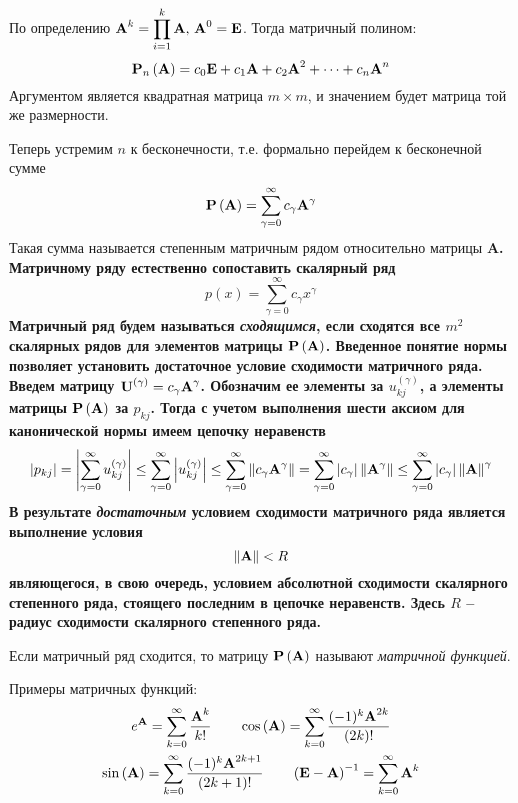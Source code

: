 По определению $\displaystyle \bf{A}^k = \prod_{i=1}^k \bf{A}, \, \bf{A}^0 = \bf{E}$. Тогда матричный полином:
\begin{equation*}
    \bf{P}_n \left( \bf{A} \right) = c_0 \bf{E} + c_1 \bf{A} + c_2 \bf{A}^2 + \dots + c_n \bf{A}^n
\end{equation*}
Аргументом является квадратная матрица $m \times m$, и значением будет матрица той же размерности.

Теперь устремим $n$ к бесконечности, т.е. формально перейдем к бесконечной сумме
\begin{equation}
    \bf{P}\left( \bf{A} \right) = \sum_{\gamma = 0}^{\infty} c_{\gamma} \bf{A}^{\gamma} \label{eq:matrix_row}
\end{equation}
Такая сумма называется степенным матричным рядом относительно матрицы \bf{A}. Матричному ряду естественно сопоставить
скалярный ряд
\begin{equation*}
    p(x) = \sum_{\gamma = 0}^{\infty} c_{\gamma} x^{\gamma}
\end{equation*}
Матричный ряд будем называться \emph{сходящимся}, если сходятся все $m^2$ скалярных рядов для элементов матрицы
$\bf{P}\left( \bf{A} \right)$. Введенное понятие нормы позволяет установить достаточное условие сходимости матричного
ряда. Введем матрицу $\displaystyle \bf{U}^{(\gamma)} = c_{\gamma}\bf{A}^{\gamma}$. Обозначим ее элементы за
$\displaystyle u_{kj}^{(\gamma)}$, а элементы матрицы $\bf{P} \left( \bf{A} \right)$ за $\displaystyle p_{kj}$. Тогда с учетом
выполнения шести аксиом для канонической нормы имеем цепочку неравенств
\begin{equation*}
    \displaystyle \left| p_{kj} \right| = \left| \sum_{\gamma = 0}^{\infty} u_{kj}^{(\gamma)} \right| \leq \sum_{\gamma = 0}^{\infty} \left| u_{kj}^{(\gamma)} \right|
    \leq \sum_{\gamma = 0}^{\infty} \left\| c_{\gamma} \bf{A}^{\gamma} \right\| = \sum_{\gamma = 0}^{\infty} \left| c_{\gamma} \right| \left\| \bf{A}^{\gamma} \right\|
    \leq \sum_{\gamma = 0}^{\infty} \left| c_{\gamma} \right| \left\| \bf{A} \right\|^{\gamma}
\end{equation*}
В результате \emph{достаточным} условием сходимости матричного ряда является выполнение условия
\begin{equation}
    \left\| \bf{A} \right\| < R
\end{equation}
являющегося, в свою очередь, условием абсолютной сходимости скалярного степенного ряда, стоящего последним в цепочке
неравенств. Здесь $R$ -- радиус сходимости скалярного степенного ряда.

\begin{definition}
    Если матричный ряд сходится, то матрицу $\bf{P} \left( \bf{A} \right)$ называют \emph{матричной функцией}.
\end{definition}
Примеры матричных функций:
\begin{gather*}
    e^{\bf{A}} = \sum_{k=0}^{\infty} \frac{\bf{A}^k}{k!} \qquad \cos\left( \bf{A} \right) = \sum_{k=0}^{\infty} \frac{(-1)^k \bf{A}^{2k}}{(2k)!} \\
    \sin \left( \bf{A} \right) = \sum_{k=0}^{\infty} \frac{(-1)^k \bf{A}^{2k + 1}}{(2k+1)!} \qquad \left( \bf{E} - \bf{A} \right)^{-1} = \sum_{k=0}^{\infty} \bf{A}^k
\end{gather*}

